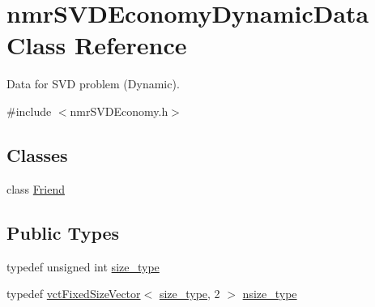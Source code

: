 \hypertarget{classnmr_s_v_d_economy_dynamic_data}{}\section{nmr\+S\+V\+D\+Economy\+Dynamic\+Data Class Reference}
\label{classnmr_s_v_d_economy_dynamic_data}


Data for S\+V\+D problem (Dynamic).  




{\ttfamily \#include $<$nmr\+S\+V\+D\+Economy.\+h$>$}

\subsection*{Classes}
\begin{DoxyCompactItemize}
\item 
class \hyperlink{classnmr_s_v_d_economy_dynamic_data_1_1_friend}{Friend}
\end{DoxyCompactItemize}
\subsection*{Public Types}
\begin{DoxyCompactItemize}
\item 
typedef unsigned int \hyperlink{classnmr_s_v_d_economy_dynamic_data_aee8ff15f2e92af24fdc3c7f5908770f3}{size\+\_\+type}
\item 
typedef \hyperlink{classvct_fixed_size_vector}{vct\+Fixed\+Size\+Vector}$<$ \hyperlink{classnmr_s_v_d_economy_dynamic_data_aee8ff15f2e92af24fdc3c7f5908770f3}{size\+\_\+type}, 2 $>$ \hyperlink{classnmr_s_v_d_economy_dynamic_data_a237cfc6761af61ac2016b2b1e71284f1}{nsize\+\_\+type}
\end{DoxyCompactItemize}
